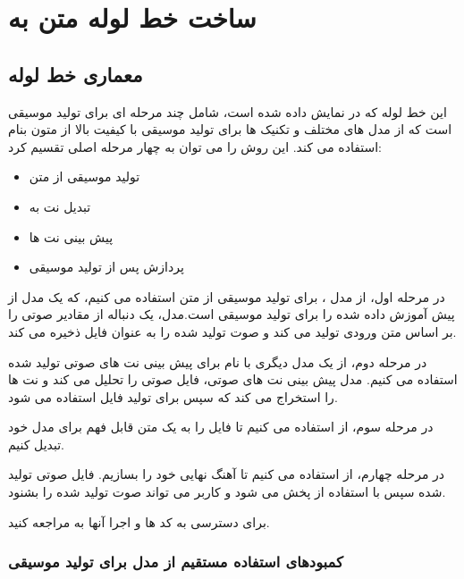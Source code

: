 
\chapter{ساخت خط لوله متن به }
\section{معماری خط‌ لوله}

این خط لوله  که در  نمایش داده شده است، شامل چند مرحله ای برای تولید موسیقی است که از مدل های مختلف و تکنیک ها برای تولید موسیقی با کیفیت بالا از متون بنام استفاده می کند. این روش را می توان به چهار مرحله اصلی تقسیم کرد:
\begin{itemize}
      \item  تولید موسیقی از متن
      \item  تبدیل نت به 
      \item پیش بینی نت ها
      \item پردازش پس از تولید موسیقی
\end{itemize}

در مرحله اول، از مدل   \cite{copet2023simple} ، برای تولید موسیقی از متن استفاده می کنیم، که یک مدل از پیش آموزش‌ داده شده را برای تولید موسیقی است.مدل، یک دنباله از مقادیر صوتی را بر اساس متن ورودی تولید می کند و صوت تولید شده را به عنوان فایل  ذخیره می کند.

در مرحله دوم، از یک مدل دیگری با نام  \cite{2022_BittnerBRME_LightweightNoteTranscription_ICASSP} برای پیش بینی نت های صوتی تولید شده استفاده می کنیم. مدل پیش بینی نت های صوتی، فایل صوتی را تحلیل می کند و نت ها را استخراج می کند که سپس برای تولید فایل  استفاده می شود.


در مرحله سوم، از   استفاده می کنیم تا فایل  را به یک متن قابل فهم برای مدل خود تبدیل کنیم.

در مرحله چهارم، از  استفاده می کنیم تا آهنگ نهایی خود را بسازیم.
فایل صوتی تولید شده سپس با استفاده از  پخش می شود و کاربر می تواند صوت تولید شده را بشنود.

برای دسترسی به کد ها و اجرا آنها به  مراجعه کنید.

\subsection{کمبودهای استفاده مستقیم از مدل  برای تولید موسیقی}

